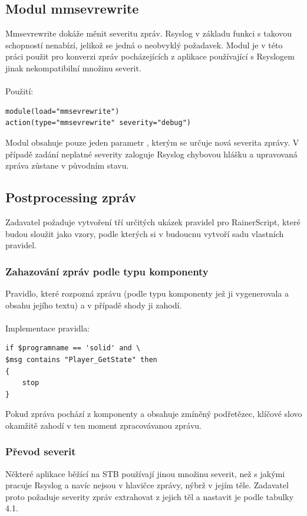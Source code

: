 \documentclass[thesis=B,czech]{FITthesis}[2012/06/26]
\begin{document}
\subsection{Modul mmsevrewrite}
Mmsevrewrite dokáže měnit severitu zpráv. Rsyslog v základu funkci s takovou schopností nenabízí, jelikož se jedná o neobvyklý požadavek. Modul je v této práci použit  pro konverzi zpráv pocházejících z aplikace používající s Rsyslogem jinak nekompatibilní množinu severit.
\\
\\
Použití:
\begin{lstlisting}[style=RainerScriptSimpleStyle]
module(load="mmsevrewrite")
action(type="mmsevrewrite" severity="debug")
\end{lstlisting}

Modul obsahuje pouze jeden parametr , kterým se určuje nová severita zprávy. V případě zadání neplatné severity zaloguje Rsyslog chybovou hlášku a upravovaná zpráva zůstane v původním stavu.

\subsection{Postprocessing zpráv}
Zadavatel požaduje vytvoření tří určitých ukázek pravidel pro RainerScript, které budou sloužit jako vzory, podle kterých si v budoucnu vytvoří sadu vlastních pravidel.

\subsubsection{Zahazování zpráv podle typu komponenty}
Pravidlo, které rozpozná zprávu (podle typu komponenty jež ji vygenerovala a obsahu jejího textu) a v případě shody ji zahodí.
\\
\\
Implementace pravidla:
\begin{lstlisting}[style=RainerScriptStyle]
if $programname == 'solid' and \
$msg contains "Player_GetState" then
{	
	stop
}
\end{lstlisting}
Pokud zpráva pochází z komponenty  a obsahuje zmíněný podřetězec, klíčové slovo  okamžitě zahodí v ten moment zpracovávanou zprávu.
\\
\subsubsection{Převod severit}
Některé aplikace běžící na STB používají jinou množinu severit, než s jakými pracuje Rsyslog a navíc nejsou v hlavičce zprávy, nýbrž v jejím těle.
Zadavatel proto požaduje severity zpráv extrahovat z jejich těl a nastavit je podle tabulky 4.1.
\end{document}
